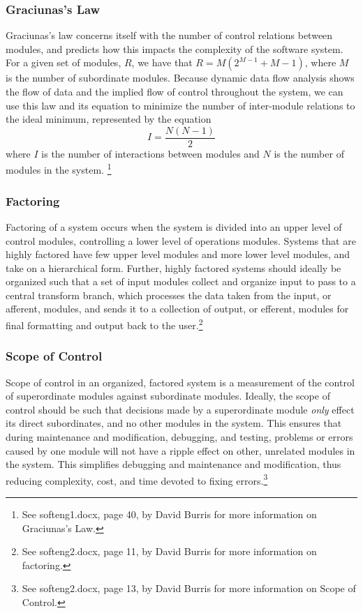 \documentclass{article}
\begin{document}
		\subsubsection{Graciunas's Law}
			Graciunas's law concerns itself with the number of control relations between modules, and predicts how this impacts the complexity of the software system. For a given set of modules, $R$, we have that $R = M(2^{M-1} + M - 1)$, where $M$ is the number of subordinate modules. Because dynamic data flow analysis shows the flow of data and the implied flow of control throughout the system, we can use this law and its equation to minimize the number of inter-module relations to the ideal minimum, represented by the equation 
			$$I = \frac{N(N - 1)}{2}$$
			where $I$ is the number of interactions between modules and $N$ is the number of modules in the system. \footnote{See softeng1.docx, page 40, by David Burris for more information on Graciunas's Law.}
		\subsubsection{Factoring}
			Factoring of a system occurs when the system is divided into an upper level of control modules, controlling a lower level of operations modules. Systems that are highly factored have few upper level modules and more lower level modules, and take on a hierarchical form. Further, highly factored systems should ideally be organized such that a set of input modules collect and organize input to pass to a central transform branch, which processes the data taken from the input, or afferent, modules, and sends it to a collection of output, or efferent, modules for final formatting and output back to the user.\footnote{See softeng2.docx, page 11, by David Burris for more information on factoring.} 
		\subsubsection{Scope of Control}
			Scope of control in an organized, factored system is a measurement of the control of superordinate modules against subordinate modules. Ideally, the scope of control should be such that decisions made by a superordinate module \emph{only} effect its direct subordinates, and no other modules in the system. This ensures that during maintenance and modification, debugging, and testing, problems or errors caused by one module will not have a ripple effect on other, unrelated modules in the system. This simplifies debugging and maintenance and modification, thus reducing complexity, cost, and time devoted to fixing errors.\footnote{See softeng2.docx, page 13, by David Burris for more information on Scope of Control.}  
\end{document}
